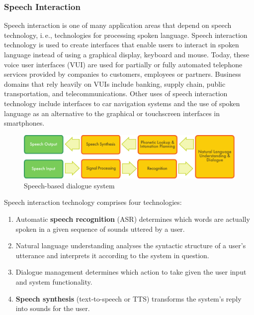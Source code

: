 \documentclass[]{../metanetpaper}
\begin{document}
\begin{multicols}{2}
\subsubsection{Speech Interaction}

Speech interaction is one of many application areas that depend on speech technology, i.\,e., technologies for processing spoken language. Speech interaction technology is used to create interfaces that enable users to interact in spoken language instead of using a graphical display, keyboard and mouse.  Today, these voice user interfaces (VUI) are used for partially or fully automated telephone services provided by companies to customers, employees or partners. Business domains that rely heavily on VUIs include banking, supply chain, public transportation, and telecommunications. Other uses of speech interaction technology include interfaces to car navigation systems and the use of spoken language as an alternative to the graphical or touchscreen interfaces in smartphones.

\begin{figure}[htb]
  \center
  \includegraphics[width=\textwidth]{../_media/english/simple_speech-based_dialogue_architecture}
  \caption{Speech-based dialogue system}
  \label{fig:dialoguearch_en}
\end{figure}

Speech interaction technology comprises four technologies: 

\begin{enumerate}
\item Automatic \textbf{speech recognition} (ASR) determines which words are actually spoken in a given sequence of sounds uttered by a user.  
\item Natural language understanding analyses the syntactic structure of a user’s utterance and interprets it according to the system in question.
\item Dialogue management determines which action to take given the user input and system functionality.   
\item \textbf{Speech synthesis} (text-to-speech or TTS) transforms the system’s reply into sounds for the user.
\end{enumerate}


\end{multicols}
\end{document}
